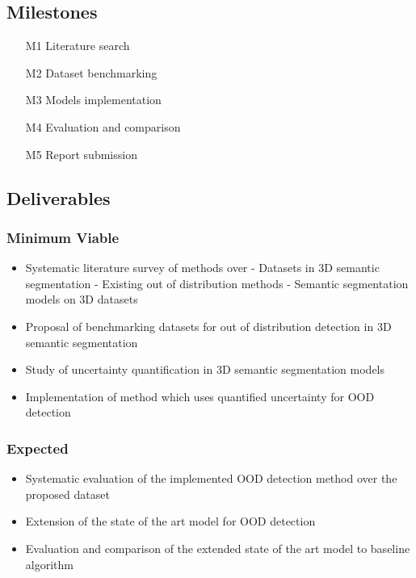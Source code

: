 \documentclass[thesis]{mas_proposal}
\begin{document}

\subsection{Milestones}
\begin{enumerate}
    \item[M1] Literature search
    \item[M2] Dataset benchmarking
    \item[M3] Models implementation
    \item[M4] Evaluation and comparison
    \item[M5] Report submission
\end{enumerate}



\subsection{Deliverables}
\subsubsection*{Minimum Viable}

\begin{itemize}
    \item Systematic literature survey of methods over
        \subitem- Datasets in 3D semantic segmentation
        \subitem- Existing out of distribution methods 
        \subitem- Semantic segmentation models on 3D datasets
    \item Proposal of benchmarking datasets for out of distribution detection in 3D semantic
    segmentation
    \item Study of uncertainty quantification in 3D semantic segmentation models
    \item Implementation of method which uses quantified uncertainty for OOD detection
\end{itemize}

\subsubsection*{Expected}
\begin{itemize}
    \item Systematic evaluation of the implemented OOD detection method over the
    proposed dataset
    \item Extension of the state of the art model for OOD detection
    \item Evaluation and comparison of the extended state of the art model to baseline algorithm
\end{itemize}
\end{document}
